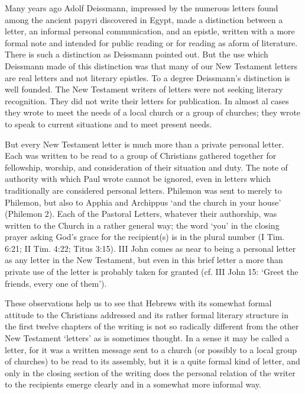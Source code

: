 Many years ago Adolf Deissmann, impressed by the numerous letters found among
the ancient papyri discovered in Egypt, made a distinction between a letter, an
informal personal communication, and an epistle, written with a more formal note
and intended for public reading or for reading as aform of literature.
There is such a distinction as Deissmann pointed out.
But the use which Deissmann made of this distinction was that many of our New
Testament letters are real letters and not literary epistles.
To a degree Deissmann's distinction is well founded.
The New Testament writers of letters were not seeking literary recognition.
They did not write their letters for publication.
In almost al cases they wrote to meet the needs of a local church or a group of
churches; they wrote to speak to current situations and to meet present needs.
\newline

But every New Testament letter is much more than a private personal letter.
Each was written to be read to a group of Christians gathered together for
fellowship, worship, and consideration of their situation and duty.
The note of authority with which Paul wrote cannot be ignored, even in letters
which traditionally are considered personal letters.
Philemon was sent to merely to Philemon, but also to Apphia and Archippus `and
the church in your house' (Philemon 2).
Each of the Pastoral Letters, whatever their authorship, was written to the
Church in a rather general way; the word `you' in the closing prayer asking
God's grace for the recipient(s) is in the plural number (I Tim. 6:21; II Tim.
4:22; Titus 3:15).
III John comes as near to being a personal letter as any letter in the New
Testament, but even in this brief letter a more than private use of the letter
is probably taken for granted (cf. III John 15: `Greet the friends, every one of
them').
\newline

These observations help us to see that Hebrews with its somewhat formal attitude
to the Christians addressed and its rather formal literary structure in the
first twelve chapters of the writing is not so radically different from the
other New Testament `letters' as is sometimes thought.
In a sense it may be called a letter, for it was a written message sent to a
church (or possibly to a local group of churches) to be read to its assembly,
but it is a quite formal kind of letter, and only in the closing section of the
writing does the personal relation of the writer to the recipients emerge
clearly and in a somewhat more informal way.
\newline

